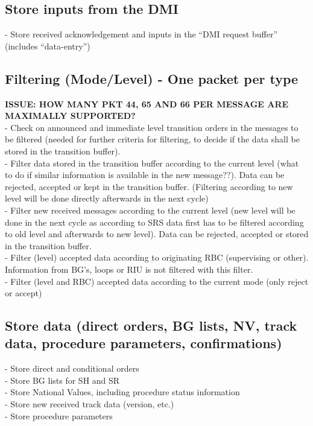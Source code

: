 \documentclass{template/openetcs_report}
\begin{document}
\subsection{Store inputs from the \gls{DMI}}
- Store received acknowledgement and inputs in the “\gls{DMI} request buffer” (includes “data-entry”)\\

\subsection{Filtering (Mode/Level) - One packet per type}
\textbf{ISSUE: HOW MANY PKT 44, 65 AND 66 PER MESSAGE ARE MAXIMALLY SUPPORTED?}\\
- Check on announced and immediate level transition orders in the messages to be filtered (needed for further criteria for filtering, to decide if the data shall be stored in the transition buffer).\\
- Filter data stored in the transition buffer according to the current level (what to do if similar information is available in the new message??). Data can be rejected, accepted or kept in the transition buffer.
(Filtering according to new level will be done directly afterwards in the next cycle)\\
- Filter new received messages according to the current level (new level will be done in the next cycle as according to \gls{SRS} data first has to be filtered according to old level and afterwards to new level). Data can be rejected, accepted or stored in the transition buffer.\\
- Filter (level) accepted data according to originating RBC (supervising or other). Information from \gls{BG}'s, loops or RIU is not filtered with this filter.\\
- Filter (level and RBC) accepted data according to the current mode (only reject or accept)\\

\subsection{Store data (direct orders, \gls{BG} lists, NV, track data, procedure parameters, confirmations)}
- Store direct and conditional orders\\
- Store \gls{BG} lists for SH and SR\\
- Store National Values, including procedure status information\\
- Store new received track data (version, etc.)\\
- Store procedure parameters\\
\end{document}
